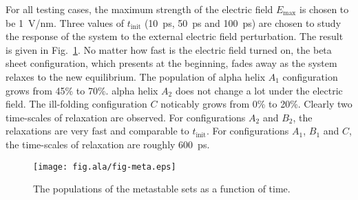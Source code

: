 \documentclass[aip,jcp,a4paper,reprint,onecolumn]{revtex4-1}
\begin{document}
For all testing cases, the maximum strength of the electric field
$E_{\textrm{max}}$ is chosen to be 1~\textsf{V/nm}.  Three values of
$t_{\textrm{init}}$ (10~\textsf{ps}, 50~\textsf{ps} and
100~\textsf{ps}) are chosen to study the response of the system to the
external electric field perturbation. The result is given in
Fig.~\ref{fig:tmp5}.  No matter how fast is the electric field turned
on, the beta sheet configuration, which presents at the beginning,
fades away as the system relaxes to the new equilibrium. The
population of alpha helix $A_1$ configuration grows from 45\% to 70\%.
alpha helix $A_2$  does not change a lot under the electric field.
The ill-folding configuration $C$ noticably grows from 0\% to 20\%.
Clearly two time-scales of relaxation are observed.  For
configurations $A_2$ and $B_2$, the relaxations are very fast and
comparable to $t_{\textrm{init}}$. For configurations $A_1$, $B_1$ and
$C$, the time-scales of relaxation are roughly 600~\textsf{ps}.
\begin{figure}
  \centering
  \texttt{[image: fig.ala/fig-meta.eps]}
  \caption{The populations of the metastable sets as a function of time.}
  \label{fig:tmp5}
\end{figure}
\end{document}
